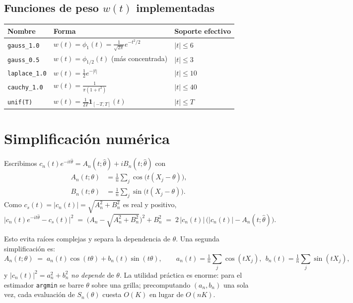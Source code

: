 \documentclass[11pt,a4paper]{article}
\begin{document}
\subsection{Funciones de peso \texorpdfstring{$w(t)$}{w(t)} implementadas}
\begin{center}\small
\begin{tabular}{@{}lll@{}}
\toprule
Nombre & Forma & Soporte efectivo \\
\midrule
\texttt{gauss\_1.0}   & $w(t)=\phi_1(t)=\frac{1}{\sqrt{2\pi}}e^{-t^2/2}$ & $|t|\le 6$ \\
\texttt{gauss\_0.5}   & $w(t)=\phi_{1/2}(t)$ (más concentrada) & $|t|\le 3$ \\
\texttt{laplace\_1.0} & $w(t)=\tfrac{1}{2}e^{-|t|}$ & $|t|\le 10$ \\
\texttt{cauchy\_1.0}  & $w(t)=\frac{1}{\pi(1+t^2)}$ & $|t|\le 40$ \\
\texttt{unif(T)}      & $w(t)=\frac{1}{2T}\mathbf{1}_{[-T,T]}(t)$ & $|t|\le T$ \\
\bottomrule
\end{tabular}
\end{center}

\section{Simplificación numérica}
\label{sec:simpl}

Escribimos $c_n(t)e^{-it\hat\theta}=A_n(t;\hat\theta)+iB_n(t;\hat\theta)$
con
\begin{align*}
A_n(t;\theta) &= \tfrac{1}{n}\sum_j \cos\!\bigl(t(X_j-\theta)\bigr), \\
B_n(t;\theta) &= \tfrac{1}{n}\sum_j \sin\!\bigl(t(X_j-\theta)\bigr).
\end{align*}
Como $c_s(t)=|c_n(t)|=\sqrt{A_n^2+B_n^2}$ es real y positivo,
\[
\bigl|c_n(t)e^{-it\hat\theta} - c_s(t)\bigr|^2
\;=\; \bigl(A_n - \sqrt{A_n^2+B_n^2}\bigr)^2 + B_n^2
\;=\; 2\,|c_n(t)|\,\bigl(|c_n(t)| - A_n(t;\hat\theta)\bigr).
\]

Esto evita raíces complejas y separa la dependencia de $\theta$. Una
segunda simplificación es:
\[
A_n(t;\theta) \;=\; a_n(t)\cos(t\theta) + b_n(t)\sin(t\theta),
\qquad
a_n(t)=\tfrac{1}{n}\sum_j\cos(tX_j),\ \ b_n(t)=\tfrac{1}{n}\sum_j\sin(tX_j),
\]
y $|c_n(t)|^2=a_n^2+b_n^2$ \emph{no depende} de $\theta$. La utilidad
práctica es enorme: para el estimador \texttt{argmin} se barre $\theta$
sobre una grilla; precomputando $(a_n, b_n)$ una sola vez, cada
evaluación de $S_n(\theta)$ cuesta $O(K)$ en lugar de $O(nK)$.
\end{document}
